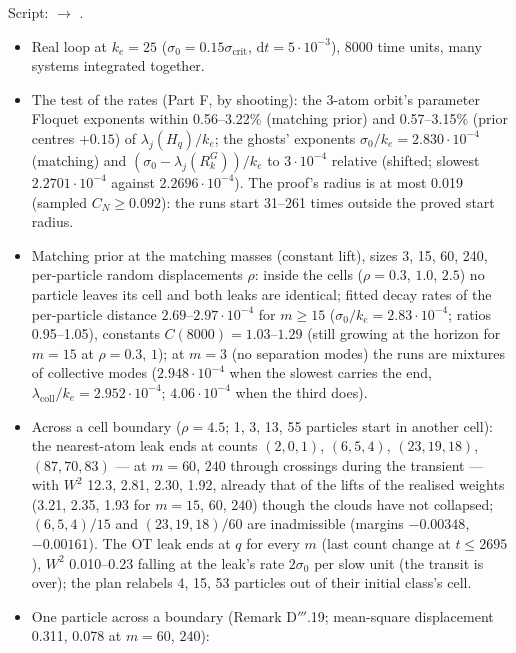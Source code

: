 Script:  $\to$ .
\begin{itemize}
  \item Real loop at $k_e=25$ ($\sigma_0=0.15\sigma_{\mathrm{crit}}$, $\mathrm{d}t=5\cdot10^{-3}$), 8000 time units,
    many systems integrated together.
  \item The test of the rates (Part F, by shooting): the 3-atom orbit's parameter Floquet exponents within
    0.56--3.22\% (matching prior) and 0.57--3.15\% (prior centres $+0.15$) of $\lambda_j(H_q)/k_e$; the ghosts'
    exponents $\sigma_0/k_e=2.830\cdot10^{-4}$ (matching) and $(\sigma_0-\lambda_j(R^G_k))/k_e$ to $3\cdot10^{-4}$
    relative (shifted; slowest $2.2701\cdot10^{-4}$ against $2.2696\cdot10^{-4}$). The proof's radius is at most
    0.019 (sampled $C_N\ge0.092$): the runs start 31--261 times outside the proved start radius.
  \item Matching prior at the matching masses (constant lift), sizes 3, 15, 60, 240, per-particle random
    displacements $\rho$: inside the cells ($\rho=0.3$, $1.0$, $2.5$) no particle leaves its cell and both leaks are
    identical; fitted decay rates of the per-particle distance $2.69$--$2.97\cdot10^{-4}$ for $m\ge15$
    ($\sigma_0/k_e=2.83\cdot10^{-4}$; ratios 0.95--1.05), constants $C(8000)=1.03$--$1.29$ (still growing at the
    horizon for $m=15$ at $\rho=0.3$, $1$); at $m=3$ (no separation modes) the runs are mixtures of collective modes
    ($2.948\cdot10^{-4}$ when the slowest carries the end, $\lambda_{\mathrm{coll}}/k_e=2.952\cdot10^{-4}$;
    $4.06\cdot10^{-4}$ when the third does).
  \item Across a cell boundary ($\rho=4.5$; 1, 3, 13, 55 particles start in another cell): the nearest-atom leak ends
    at counts $(2,0,1)$, $(6,5,4)$, $(23,19,18)$, $(87,70,83)$ --- at $m=60$, $240$ through crossings during the
    transient --- with $W^2$ 12.3, 2.81, 2.30, 1.92, already that of the lifts of the realised weights (3.21, 2.35,
    1.93 for $m=15$, $60$, $240$) though the clouds have not collapsed; $(6,5,4)/15$ and $(23,19,18)/60$ are
    inadmissible (margins $-0.00348$, $-0.00161$). The OT leak ends at $q$ for every $m$ (last count change at
    $t\le2695$), $W^2$ 0.010--0.23 falling at the leak's rate $2\sigma_0$ per slow unit (the transit is over); the
    plan relabels 4, 15, 53 particles out of their initial class's cell.
  \item One particle across a boundary (Remark D$'''$.19; mean-square displacement 0.311, 0.078 at $m=60$, $240$):

\end{itemize}
